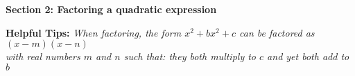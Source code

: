 \documentclass{article}
\begin{document}
\vspace{1cm}
\noindent

\noindent
\textbf{Section 2: Factoring a quadratic expression}

\begin{tcolorbox}[
    width=\linewidth,
    colframe=black,         %
    colback=white,          %
    boxrule=0.5pt,          %
    left=1mm, right=1.1mm,    %
    top=1mm, bottom=1mm,    %
    arc=2mm                 %
]
\textbf{Helpful Tips: } 
\textit{When factoring, the form $x^2 + bx^2 + c$ can be factored as $(x-m)(x-n)$\\
\hspace*{2.5cm} with real numbers $m$ and $n$ such that: they both multiply to $c$ and yet both add to $b$}
\end{tcolorbox}
\end{document}
